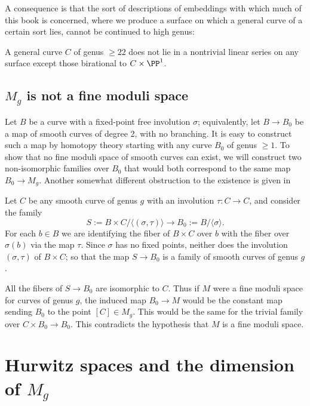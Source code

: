  A consequence is that the sort of descriptions of embeddings with which much of this book is concerned, where we produce a surface on which a general curve of a certain sort lies, cannot be continued to high genus:

\begin{fact}
 A general curve $C$ of  genus $\geq 22$ does not lie in a nontrivial linear series on any surface
 except those birational to $C\times \PP^1$. 
\end{fact}


\subsection{$M_g$ is not a fine moduli space}\label{coarse moduli}

Let $B$ be a curve with a fixed-point free involution $\sigma$; equivalently, let $B \to B_0$ be a map of smooth curves of degree 2, with no branching. It is easy to construct such a map by homotopy theory starting with any curve $B_0$ of genus $\geq 1$. 
To show that no fine moduli space of smooth curves can exist, we will construct two non-isomorphic families over $B_0$ that
would both correspond to the same map $B_0\to M_g$. Another somewhat different obstruction to the existence is given in 
\cite[Chapter 6]{DE-JH-schemes}

Let $C$ be any smooth curve of genus $g$ with an involution $\tau : C \to C$, and consider the family
$$
S := B \times C/\langle (\sigma, \tau) \rangle \to B_0 := B/\langle \sigma \rangle.
$$
For each $b \in B$ we are identifying the fiber of $B \times C$ over $b$ with the fiber over $\sigma(b)$ via the map $\tau$. Since $\sigma$ has no fixed points, neither does the involution $(\sigma, \tau)$ of $B \times C$; so that the map $S \to B_0$ is a family of smooth curves of genus $g$.

All the fibers of $S \to B_0$ are isomorphic to $C$. Thus if $M$ were a fine moduli space for curves of genus $g$,
 the induced map $B_0 \to M$ would be the constant map sending $B_0$ to the point $[C] \in M_g$. This would be the
 same for the trivial family over $C\times B_0 \to B_0$. This contradicts the hypothesis that $M$ is a fine moduli space. 


\section{Hurwitz spaces and the dimension of $M_g$}\label{Hurwitz section}

